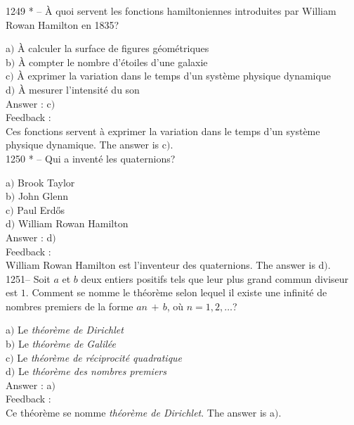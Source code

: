 ﻿\documentclass[letterpaper, 12pt]{article}
\begin{document}
1249 * -- \`A quoi servent les fonctions hamiltoniennes introduites
par William Rowan Hamilton en 1835?

a$)$ \`A calculer la surface de figures g\'eom\'etriques \\
b$)$ \`A compter le nombre d'\'etoiles d'une galaxie \\
c$)$ \`A exprimer la variation dans le temps d'un syst\`eme physique
dynamique \\
d$)$ \`A mesurer l'intensit\'e du son \\

Answer : c$)$\\

Feedback : \\
Ces fonctions servent \`a exprimer la variation dans le temps d'un
syst\`eme physique dynamique.
The answer is c$)$.\\

1250 * -- Qui a invent\'e les quaternions?

a$)$ Brook Taylor \\
b$)$ John Glenn \\
c$)$ Paul Erd\H{o}s \\
d$)$ William Rowan Hamilton\\

Answer : d$)$\\

Feedback : \\
William Rowan Hamilton est l'inventeur des quaternions.
The answer is d$)$.\\

1251-- Soit $a$ et $b$ deux entiers positifs tels que leur plus
grand commun diviseur est $1$. Comment se nomme le th\'eor\`eme
selon lequel il existe une infinit\'e de nombres premiers de la
forme $an\,+\,b$, o\`u $n=1,2,\ldots$?

a$)$ Le {\sl th\'eor\`eme de Dirichlet} \\
b$)$ Le {\sl th\'eor\`eme de Galil\'ee} \\
c$)$ Le {\sl th\'eor\`eme de r\'eciprocit\'e quadratique} \\
d$)$ Le {\sl th\'eor\`eme des nombres premiers}\\

Answer : a$)$\\

Feedback : \\
Ce th\'eor\`eme se nomme {\sl th\'eor\`eme de Dirichlet}.
The answer is a$)$.\\
\end{document}

